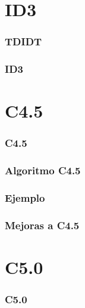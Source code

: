 \section{ID3}
\begin{frame}
  \frametitle{TDIDT}
\end{frame}

\begin{frame}
  \frametitle{ID3}
\end{frame}

\section{C4.5}
\begin{frame}
  \frametitle{C4.5}
\end{frame}

\begin{frame}
  \frametitle{Algoritmo C4.5}
\end{frame}

\begin{frame}
  \frametitle{Ejemplo}
\end{frame}

\begin{frame}
  \frametitle{Mejoras a C4.5}
\end{frame}

\section{C5.0}

\begin{frame}
  \frametitle{C5.0}
\end{frame}





